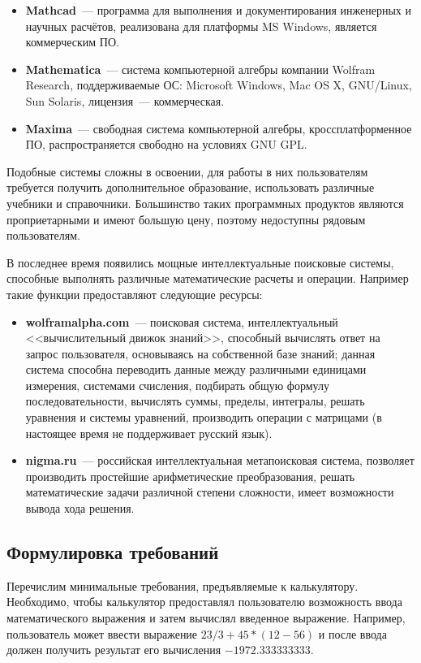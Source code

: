 \begin{itemize}
\item {\bf Mathcad}~--- программа для выполнения и документирования инженерных 
и научных расчётов, реализована для платформы MS Windows, является 
коммерческим ПО.

\item {\bf Mathematica}~--- система компьютерной алгебры компании Wolfram Research, 
поддерживаемые ОС: Microsoft Windows, Mac OS X, GNU/Linux, Sun Solaris, 
лицензия~--- коммерческая.

\item {\bf Maxima}~--- свободная система компьютерной алгебры, 
кроссплатформенное ПО, распространяется свободно на условиях GNU GPL.
\end{itemize}

Подобные системы сложны в освоении, для работы в них пользователям 
требуется получить дополнительное образование, использовать 
различные учебники и справочники. Большинство таких программных продуктов
являются проприетарными и имеют большую цену, поэтому недоступны 
рядовым пользователям.

В последнее время появились мощные интеллектуальные поисковые системы, 
способные выполнять различные математические расчеты и операции. 
Например такие функции предоставляют следующие ресурсы: 
\begin{itemize}
\item {\bf wolframalpha.com}~--- поисковая система, интеллектуальный 
<<вычислительный движок знаний>>, способный вычислять ответ 
на запрос пользователя, основываясь на собственной базе знаний; 
данная система способна переводить данные между различными 
единицами измерения, системами счисления, подбирать общую 
формулу последовательности, вычислять суммы, пределы, интегралы, 
решать уравнения и системы уравнений, производить операции с матрицами 
(в настоящее время не поддерживает русский язык).

\item {\bf nigma.ru}~--- российская интеллектуальная метапоисковая система, 
позволяет производить простейшие арифметические преобразования, 
решать математические задачи различной степени сложности, 
имеет возможности вывода хода решения.
\end{itemize}

\subsection{Формулировка требований}
Перечислим минимальные требования, предъявляемые к калькулятору.
Необходимо, чтобы калькулятор предоставлял пользователю 
возможность ввода математического выражения и затем вычислял 
введенное выражение. Например, пользователь может ввести 
выражение $23/3+45*(12-56)$ и после ввода должен получить 
результат его вычисления $-1972.333333333$.

